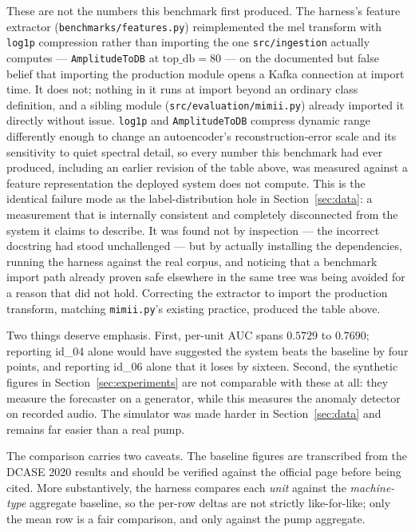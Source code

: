 \documentclass[11pt]{article}
\begin{document}
These are not the numbers this benchmark first produced. The harness's feature
extractor (\texttt{benchmarks/features.py}) reimplemented the mel transform
with \texttt{log1p} compression rather than importing the one
\texttt{src/ingestion} actually computes --- \texttt{AmplitudeToDB} at
$\text{top\_db}{=}80$ --- on the documented but false belief that importing the
production module opens a Kafka connection at import time. It does not; nothing
in it runs at import beyond an ordinary class definition, and a sibling module
(\texttt{src/evaluation/mimii.py}) already imported it directly without issue.
\texttt{log1p} and \texttt{AmplitudeToDB} compress dynamic range differently
enough to change an autoencoder's reconstruction-error scale and its
sensitivity to quiet spectral detail, so every number this benchmark had ever
produced, including an earlier revision of the table above, was measured
against a feature representation the deployed system does not compute. This is
the identical failure mode as the label-distribution hole in
Section~\ref{sec:data}: a measurement that is internally consistent and
completely disconnected from the system it claims to describe. It was found
not by inspection --- the incorrect docstring had stood unchallenged --- but by
actually installing the dependencies, running the harness against the real
corpus, and noticing that a benchmark import path already proven safe
elsewhere in the same tree was being avoided for a reason that did not hold.
Correcting the extractor to import the production transform, matching
\texttt{mimii.py}'s existing practice, produced the table above.

Two things deserve emphasis. First, per-unit AUC spans $0.5729$ to $0.7690$;
reporting id\_04 alone would have suggested the system beats the baseline by
four points, and reporting id\_06 alone that it loses by sixteen. Second, the
synthetic figures in Section~\ref{sec:experiments} are not comparable with these
at all: they measure the forecaster on a generator, while this measures the
anomaly detector on recorded audio. The simulator was made harder in
Section~\ref{sec:data} and remains far easier than a real pump.

The comparison carries two caveats. The baseline figures are transcribed from
the DCASE 2020 results and should be verified against the official page before
being cited. More substantively, the harness compares each \emph{unit} against
the \emph{machine-type} aggregate baseline, so the per-row deltas are not
strictly like-for-like; only the mean row is a fair comparison, and only against
the pump aggregate.
\end{document}
